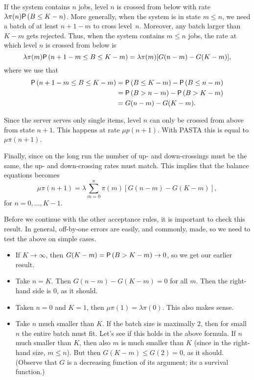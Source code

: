 \begin{exercise}{\faPhoto}
\begin{solution}
  If the system contains $n$ jobs,  level $n$ is
  crossed from below with rate $\lambda \pi(n) \P{B \leq K-n}$.  More generally,
  when the system is in state $m\leq n$, we need a batch of at least
  $n+1-m$ to cross level~$n$. Moreover, any batch larger than $K-m$
  gets rejected. Thus, when the system contains $m \leq n $ jobs, the
  rate at which level $n$ is crossed from below is
  \begin{equation*}
  \lambda \pi(m) \P{n+1-m\leq B \leq K-m}  = \lambda \pi(m)
  [G(n-m)-G(K-m)],
  \end{equation*}
where we use that
\begin{align*}
\P{n+1-m\leq B \leq K-m} 
&= \P{B \leq K-m} - \P{B \leq n-m}  \\
&= \P{B > n-m} - \P{B > K-m} \\
&= G(n-m)-G(K-m).
\end{align*}

  Since the server serves only single items, level $n$ can only be
  crossed from above from state $n+1$. This happens at rate $\mu p(n+1)$. With PASTA this is equal to $\mu \pi(n+1)$.

  Finally, since on the long run the number of up- and down-crossings must
  be the same, the up- and down-crossing rates must match. This implies
  that the balance equations becomes
  \begin{equation*}
    \mu \pi(n+1) = \lambda \sum_{m=0}^n \pi(m)   [G(n-m)-G(K-m)],
  \end{equation*}
  for $n=0,\ldots, K-1$. 

  Before we continue with the other acceptance rules, it is important
  to check this result.  In general, off-by-one errors are easily, and
  commonly, made, so we need to test the above on simple cases. 
  \begin{itemize}
  \item  If $K\to \infty$, then $G(K-m)=\P{B>K-m}\to 0$, so we get our earlier result. 
  \item Take $n=K$. Then $G(n-m)-G(K-m)=0$ for all $m$. Then the right-hand side is 0, as it should.
  \item Taken $n=0$ and $K=1$, then $\mu \pi(1)= \lambda \pi(0)$. This also makes sense. 
  \item Take $n$ much smaller than $K$. If the batch size is maximally
    $2$, then for small $n$ the entire batch must fit. Let's see if
    this holds in the above formula. If $n$ much smaller than $K$,
    then also $m$ is much smaller than $K$ (since in the right-hand
    size, $m\leq n$). But then $G(K-m) \leq G(2) = 0$, as it
    should. (Observe that $G$ is a decreasing function of its argument;
    its a survival function.)
  \end{itemize}


\end{solution}
\end{exercise}
